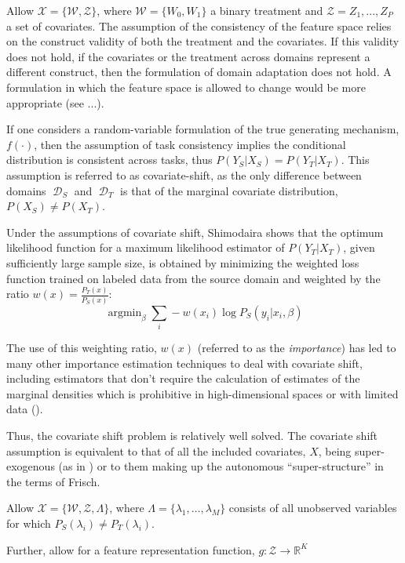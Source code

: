 \documentclass[a4paper,12pt]{article}
\DeclareMathOperator*{\argmin}{argmin}
\DeclareMathOperator*{\D}{\mathcal{D}}
\begin{document}
Allow $\mathcal{X} = \{\mathcal{W}, \mathcal{Z}\}$, where $\mathcal{W} = \{W_0, W_1\}$ a binary treatment and $\mathcal{Z} = {Z_1,...,Z_P}$ a set of covariates. The assumption of the consistency of the feature space relies on the construct validity of both the treatment and the covariates. If this validity does not hold, if the covariates or the treatment across domains represent a different construct, then the formulation of domain adaptation does not hold. A formulation in which the feature space is allowed to change would be more appropriate (see ...). 

If one considers a random-variable formulation of the true generating mechanism, $f(\cdot)$, then the assumption of task consistency implies the conditional distribution is consistent across tasks, thus $P(Y_S | X_S) = P(Y_T | X_T)$. This assumption is referred to as covariate-shift, as the only difference between domains $\D_S$ and $\D_T$ is that of the marginal covariate distribution, $P(X_S) \neq P(X_T)$. 

Under the assumptions of covariate shift, Shimodaira \parencite*{Shimodaira2000} shows that the optimum likelihood function for a maximum likelihood estimator of $P(Y_T | X_T)$, given sufficiently large sample size, is obtained by minimizing the weighted loss function trained on labeled data from the source domain and weighted by the ratio $w(x) = \frac{P_T(x)}{P_S(x)}$: 
%
$$
\argmin_{\beta} \sum_i -w(x_i) \log P_S(y_i | x_i, \beta)
$$

The use of this weighting ratio, $w(x)$ (referred to as the \textit{importance}) has led to many other importance estimation techniques to deal with covariate shift, including estimators that don't require the calculation of estimates of the marginal densities which is prohibitive in high-dimensional spaces or with limited data (\cite{foo}). 

Thus, the covariate shift problem is relatively well solved. The covariate shift assumption is equivalent to that of all the included covariates, $X$, being super-exogenous (as in \cite{Engle1983}) or to them making up the autonomous ``super-structure'' in the terms of Frisch. 

Allow $\mathcal{X} = \{ \mathcal{W}, \mathcal{Z}, \Lambda \}$, where $\Lambda = \{\lambda_1,\dots,\lambda_M\}$ consists of all unobserved variables for which $P_S(\lambda_i) \neq P_T(\lambda_i)$. 

Further, allow for a feature representation function, $g: \mathcal{Z} \rightarrow \mathbb{R}^K$ 
\end{document}
